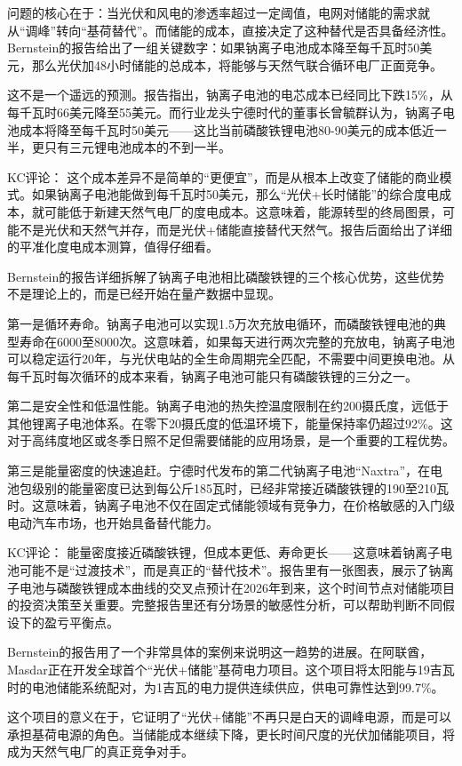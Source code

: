 \documentclass[11pt]{ctexart}
\begin{document}
问题的核心在于：当光伏和风电的渗透率超过一定阈值，电网对储能的需求就从“调峰”转向“基荷替代”。而储能的成本，直接决定了这种替代是否具备经济性。Bernstein的报告给出了一组关键数字：如果钠离子电池成本降至每千瓦时50美元，那么光伏加48小时储能的总成本，将能够与天然气联合循环电厂正面竞争。

这不是一个遥远的预测。报告指出，钠离子电池的电芯成本已经同比下跌15\%，从每千瓦时66美元降至55美元。而行业龙头宁德时代的董事长曾毓群认为，钠离子电池成本将降至每千瓦时50美元——这比当前磷酸铁锂电池80-90美元的成本低近一半，更只有三元锂电池成本的不到一半。

KC评论： 这个成本差异不是简单的“更便宜”，而是从根本上改变了储能的商业模式。如果钠离子电池能做到每千瓦时50美元，那么“光伏+长时储能”的综合度电成本，就可能低于新建天然气电厂的度电成本。这意味着，能源转型的终局图景，可能不是光伏和天然气并存，而是光伏+储能直接替代天然气。报告后面给出了详细的平准化度电成本测算，值得仔细看。

Bernstein的报告详细拆解了钠离子电池相比磷酸铁锂的三个核心优势，这些优势不是理论上的，而是已经开始在量产数据中显现。

第一是循环寿命。钠离子电池可以实现1.5万次充放电循环，而磷酸铁锂电池的典型寿命在6000至8000次。这意味着，如果每天进行两次完整的充放电，钠离子电池可以稳定运行20年，与光伏电站的全生命周期完全匹配，不需要中间更换电池。从每千瓦时每次循环的成本来看，钠离子电池可能只有磷酸铁锂的三分之一。

第二是安全性和低温性能。钠离子电池的热失控温度限制在约200摄氏度，远低于其他锂离子电池体系。在零下20摄氏度的低温环境下，能量保持率仍超过92\%。这对于高纬度地区或冬季日照不足但需要储能的应用场景，是一个重要的工程优势。

第三是能量密度的快速追赶。宁德时代发布的第二代钠离子电池“Naxtra”，在电池包级别的能量密度已达到每公斤185瓦时，已经非常接近磷酸铁锂的190至210瓦时。这意味着，钠离子电池不仅在固定式储能领域有竞争力，在价格敏感的入门级电动汽车市场，也开始具备替代能力。

KC评论： 能量密度接近磷酸铁锂，但成本更低、寿命更长——这意味着钠离子电池可能不是“过渡技术”，而是真正的“替代技术”。报告里有一张图表，展示了钠离子电池与磷酸铁锂成本曲线的交叉点预计在2026年到来，这个时间节点对储能项目的投资决策至关重要。完整报告里还有分场景的敏感性分析，可以帮助判断不同假设下的盈亏平衡点。

Bernstein的报告用了一个非常具体的案例来说明这一趋势的进展。在阿联酋，Masdar正在开发全球首个“光伏+储能”基荷电力项目。这个项目将太阳能与19吉瓦时的电池储能系统配对，为1吉瓦的电力提供连续供应，供电可靠性达到99.7\%。

这个项目的意义在于，它证明了“光伏+储能”不再只是白天的调峰电源，而是可以承担基荷电源的角色。当储能成本继续下降，更长时间尺度的光伏加储能项目，将成为天然气电厂的真正竞争对手。
\end{document}
